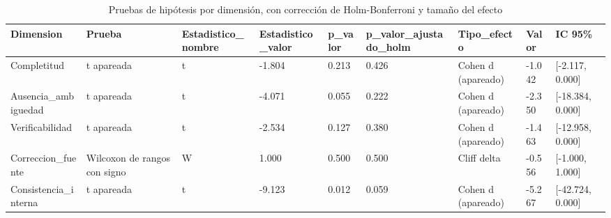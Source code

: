\begin{table}[htbp]
\centering
\caption{Pruebas de hipótesis por dimensión, con corrección de Holm-Bonferroni y tamaño del efecto}
\label{tab:hipotesis}
\begin{tabular}{lllllllll}
\toprule
Dimension & Prueba & Estadistico\_nombre & Estadistico\_valor & p\_valor & p\_valor\_ajustado\_holm & Tipo\_efecto & Valor & IC 95\% \\
\midrule
Completitud & t apareada & t & -1.804 & 0.213 & 0.426 & Cohen d (apareado) & -1.042 & [-2.117, 0.000] \\
Ausencia\_ambiguedad & t apareada & t & -4.071 & 0.055 & 0.222 & Cohen d (apareado) & -2.350 & [-18.384, 0.000] \\
Verificabilidad & t apareada & t & -2.534 & 0.127 & 0.380 & Cohen d (apareado) & -1.463 & [-12.958, 0.000] \\
Correccion\_fuente & Wilcoxon de rangos con signo & W & 1.000 & 0.500 & 0.500 & Cliff delta & -0.556 & [-1.000, 1.000] \\
Consistencia\_interna & t apareada & t & -9.123 & 0.012 & 0.059 & Cohen d (apareado) & -5.267 & [-42.724, 0.000] \\
\bottomrule
\end{tabular}
\end{table}
